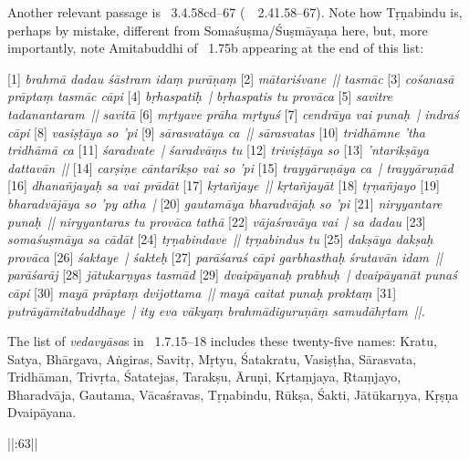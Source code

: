 {{  
 
  Another relevant passage is \BRAHMANDAPUR\ 3.4.58cd--67 {\rm (}\similar\ \VAYUP\ 2.41.58--67{\rm )}.
  Note how Tṛṇabindu is, perhaps by mistake, different from Somaśuṣma/Śuṣmāyaṇa here,
  but, more importantly, note Amitabuddhi of \VSS\ 1.75b appearing at the end of this list:
  
 
  [1] \textit{brahmā dadau śāstram idaṃ purāṇaṃ }[2]\textit{ mātariśvane~|| 
  tasmāc }[3]\textit{ cośanasā prāptaṃ tasmāc cāpi }[4]\textit{ bṛhaspatiḥ~| 
  bṛhaspatis tu provāca }[5]\textit{ savitre tadanantaram~|| 
  savitā }[6]\textit{ mṛtyave prāha mṛtyuś }[7]\textit{ cendrāya vai punaḥ~| 
  indraś cāpi }[8]\textit{ vasiṣṭāya so 'pi }[9]\textit{ sārasvatāya ca~|| 
  sārasvatas }[10]\textit{ tridhāmne 'tha tridhāmā ca }[11]\textit{ śaradvate~| 
  śaradvāṃs tu }[12]\textit{ triviṣṭāya so }[13]\textit{ 'ntarikṣāya dattavān~|| 
  }[14]\textit{ carṣiṇe cāntarikṣo vai so 'pi }[15]\textit{ trayyāruṇāya ca~| 
  trayyāruṇād }[16]\textit{ dhanañjayaḥ sa vai prādāt }[17]\textit{ kṛtañjaye~|| 
  kṛtañjayāt }[18]\textit{ tṛṇañjayo }[19]\textit{ bharadvājāya so 'py atha~| 
  }[20]\textit{ gautamāya bharadvājaḥ so 'pi }[21]\textit{ niryyantare punaḥ~|| 
  niryyantaras tu provāca tathā }[22]\textit{ vājaśravāya vai~| 
  sa dadau }[23]\textit{ somaśuṣmāya sa cādāt }[24]\textit{ tṛṇabindave~|| 
  tṛṇabindus tu }[25]\textit{ dakṣāya dakṣaḥ provāca }[26]\textit{ śaktaye~| 
  śakteḥ }[27]\textit{ parāśaraś cāpi garbhasthaḥ śrutavān idam~|| 
  parāśarāj }[28]\textit{ jātukarṇyas tasmād }[29]\textit{ dvaipāyanaḥ prabhuḥ~| 
  dvaipāyanāt punaś cāpi }[30]\textit{ mayā prāptaṃ dvijottama~|| 
  mayā caitat punaḥ proktaṃ }[31]\textit{ putrāyāmitabuddhaye~| 
  ity eva vākyaṃ brahmādiguruṇāṃ samudāhṛtam~||.} 
 
  
 
  The list of \textit{vedavyāsa}s in \LINPU\ 1.7.15--18 includes these twenty-five names:
  Kratu, Satya, Bhārgava, Aṅgiras, Savitṛ,
  Mṛtyu, Śatakratu, Vasiṣṭha, Sārasvata, Tridhāman,
  Trivṛta, Śatatejas, Tarakṣu, Āruṇi, Kṛtaṃjaya,
  Ṛtaṃjayo, Bharadvāja, Gautama, Vācaśravas, Tṛṇabindu,
  Rūkṣa, Śakti, Jātūkarṇya, Kṛṣṇa Dvaipāyana.
 }}


  ||:63\thinspace||%

